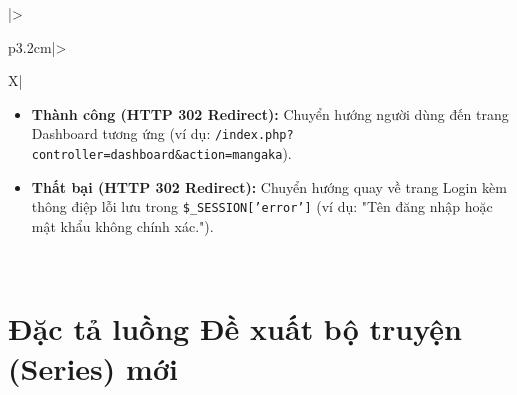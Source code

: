 \begin{table}[H]
\begin{tabularx}{\textwidth}{|>{\raggedright\arraybackslash\bfseries}p{3.2cm}|>{\raggedright\arraybackslash}X|}
\begin{minipage}[t]{\linewidth}
    \begin{itemize}[leftmargin=*]
        \item \textbf{Thành công (HTTP 302 Redirect):} Chuyển hướng người dùng đến trang Dashboard tương ứng (ví dụ: \texttt{/index.php?}\allowbreak\texttt{controller=dashboard\&}\allowbreak\texttt{action=mangaka}).
        \item \textbf{Thất bại (HTTP 302 Redirect):} Chuyển hướng quay về trang Login kèm thông điệp lỗi lưu trong \texttt{\$\_SESSION['error']} (ví dụ: "Tên đăng nhập hoặc mật khẩu không chính xác.").
    \end{itemize}
\end{minipage} \\ \hline
\end{tabularx}
\caption{Đặc tả yêu cầu đăng nhập hệ thống}
\label{tab:api_auth_login}
\end{table}

\newpage

\section{Đặc tả luồng Đề xuất bộ truyện (Series) mới}
\label{sec:api_series_store}

